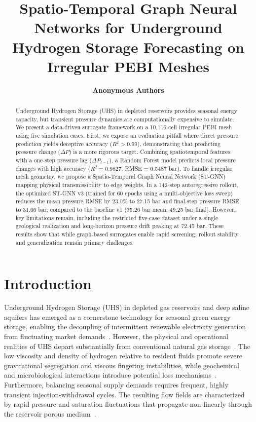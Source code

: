 \documentclass[10pt,twocolumn]{article}
\title{\textbf{Spatio-Temporal Graph Neural Networks for Underground Hydrogen Storage Forecasting on Irregular PEBI Meshes}}
\author{\textbf{Anonymous Authors}}
\affil{Anonymous Institution}
\date{}
\begin{document}
\maketitle

\begin{abstract}
Underground Hydrogen Storage (UHS) in depleted reservoirs provides seasonal energy capacity, but transient pressure dynamics are computationally expensive to simulate. We present a data-driven surrogate framework on a 10,116-cell irregular PEBI mesh using five simulation cases. First, we expose an evaluation pitfall where direct pressure prediction yields deceptive accuracy ($R^2 > 0.99$), demonstrating that predicting pressure change ($\Delta P$) is a more rigorous target. Combining spatiotemporal features with a one-step pressure lag ($\Delta P_{t-1}$), a Random Forest model predicts local pressure changes with high accuracy ($R^2 = 0.9827$, RMSE = 0.5487 bar). To handle irregular mesh geometry, we propose a Spatio-Temporal Graph Neural Network (ST-GNN) mapping physical transmissibility to edge weights. In a 142-step autoregressive rollout, the optimized ST-GNN v3 (trained for 60 epochs using a multi-objective loss sweep) reduces the mean pressure RMSE by 23.0\% to 27.15 bar and final-step pressure RMSE to 31.66 bar, compared to the baseline v1 (35.26 bar mean, 49.25 bar final). However, key limitations remain, including the restricted five-case dataset under a single geological realization and long-horizon pressure drift peaking at 72.45 bar. These results show that while graph-based surrogates enable rapid screening, rollout stability and generalization remain primary challenges.
\end{abstract}

\section{Introduction}
Underground Hydrogen Storage (UHS) in depleted gas reservoirs and deep saline aquifers has emerged as a cornerstone technology for seasonal green energy storage, enabling the decoupling of intermittent renewable electricity generation from fluctuating market demands~\cite{verma2024uhs}. However, the physical and operational realities of UHS depart substantially from conventional natural gas storage~\cite{pal2024uhsLithuania}. The low viscosity and density of hydrogen relative to resident fluids promote severe gravitational segregation and viscous fingering instabilities, while geochemical and microbiological interactions introduce potential loss mechanisms~\cite{heinemann2021}. Furthermore, balancing seasonal supply demands requires frequent, highly transient injection-withdrawal cycles. The resulting flow fields are characterized by rapid pressure and saturation fluctuations that propagate non-linearly through the reservoir porous medium~\cite{rashid2023geoenergy}.
\end{document}
